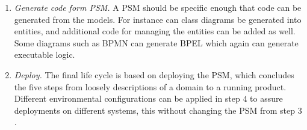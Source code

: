 \begin{enumerate}
  \item \emph{Generate code form PSM.}
    A PSM should be specific enough that code can be generated from the models.
    For instance can class diagrams be generated into entities, and additional
    code for managing the entities can be added as well.
    Some diagrams such as BPMN can generate BPEL which again can generate executable logic.
  \item \emph{Deploy.}
    The final life cycle is based on deploying the PSM, which concludes the five steps from
    loosely descriptions of a domain to a running product.
    Different environmental configurations can be applied in step $4$ to assure deployments
    on different systems, this without changing the PSM from step $3$.
\end{enumerate}
